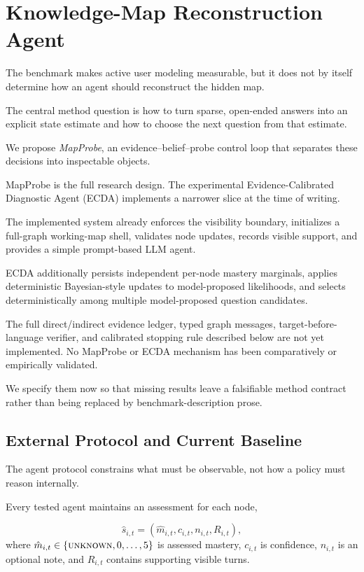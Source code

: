 \section{Knowledge-Map Reconstruction Agent}
\label{sec:reconstruction-agent}

The benchmark makes active user modeling measurable, but it does not by itself determine how an agent
should reconstruct the hidden map.

The central method question is how to turn sparse, open-ended answers into an explicit state estimate
and how to choose the next question from that estimate.

We propose \emph{MapProbe}, an evidence--belief--probe control loop that separates these decisions into
inspectable objects.

MapProbe is the full research design. The experimental Evidence-Calibrated Diagnostic Agent (ECDA)
implements a narrower slice at the time of writing.

The implemented system already enforces the visibility boundary, initializes a full-graph working-map
shell, validates node updates, records visible support, and provides a simple prompt-based LLM agent.

ECDA additionally persists independent per-node mastery marginals, applies deterministic Bayesian-style
updates to model-proposed likelihoods, and selects deterministically among multiple model-proposed
question candidates.

The full direct/indirect evidence ledger, typed graph messages, target-before-language verifier, and
calibrated stopping rule described below are not yet implemented. No MapProbe or ECDA mechanism has
been comparatively or empirically validated.

We specify them now so that missing results leave a falsifiable method contract rather than being
replaced by benchmark-description prose.

\subsection{External Protocol and Current Baseline}
\label{sec:agent}

The agent protocol constrains what must be observable, not how a policy must reason internally.

Every tested agent maintains an assessment for each node,

\begin{equation}
    \hat{s}_{i,t} = (\hat{m}_{i,t}, c_{i,t}, n_{i,t}, R_{i,t}),
\end{equation}
where $\hat{m}_{i,t} \in \{\textsc{unknown},0,\ldots,5\}$ is assessed mastery, $c_{i,t}$ is confidence,
$n_{i,t}$ is an optional note, and $R_{i,t}$ contains supporting visible turns.

